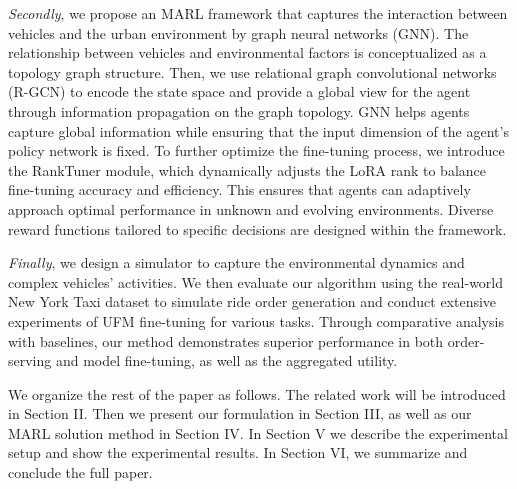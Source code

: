 \smallskip
{\em Secondly}, we propose an MARL framework that captures the interaction between vehicles and the urban environment by graph neural networks (GNN). The relationship between vehicles and environmental factors is conceptualized as a topology graph structure. Then, we use relational graph convolutional networks (R-GCN) to encode the state space and provide a global view for the agent through information propagation on the graph topology. GNN helps agents capture global information while ensuring that the input dimension of the agent's policy network is fixed. 
To further optimize the fine-tuning process, we introduce the RankTuner module, which dynamically adjusts the LoRA rank to balance fine-tuning accuracy and efficiency.
This ensures that agents can adaptively approach optimal performance in unknown and evolving environments. Diverse reward functions tailored to specific decisions are designed within the framework. 


\smallskip
{\em Finally}, we design a simulator to capture the environmental dynamics and complex vehicles' activities. We then evaluate our algorithm using the real-world New York Taxi dataset to simulate ride order generation and conduct extensive experiments of UFM fine-tuning for various tasks. Through comparative analysis with baselines, our method demonstrates superior performance in both order-serving and model fine-tuning, as well as the aggregated utility.


\smallskip
We organize the rest of the paper as follows. The related work will be introduced in Section II. Then we present our formulation in Section III, as well as our MARL solution method in Section IV. In Section V we describe the experimental setup and show the experimental results. In Section VI, we summarize and conclude the full paper.


